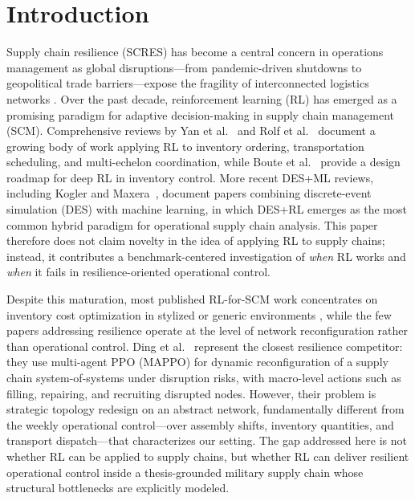 \hypertarget{1-introduction}{%
\section{Introduction}\label{1-introduction}}

Supply chain resilience (SCRES) has become a central concern in
operations management as global disruptions---from pandemic-driven
shutdowns to geopolitical trade barriers---expose the fragility of
interconnected logistics networks \cite{ponomarov2009understanding,wieland2021two,hosseini2019review}. Over the past decade, reinforcement
learning (RL) has emerged as a promising paradigm for adaptive
decision-making in supply chain management (SCM). Comprehensive reviews
by Yan et al.~\cite{yan2022} and Rolf et al.~\cite{rolf2023} document a growing body of
work applying RL to inventory ordering, transportation scheduling, and
multi-echelon coordination, while Boute et al.~\cite{boute2022} provide a design
roadmap for deep RL in inventory control. More recent DES+ML reviews,
including Kogler and Maxera~\cite{kogler2026}, document papers combining discrete-event simulation (DES) with
machine learning, in which DES+RL emerges as the most common hybrid
paradigm for operational supply chain analysis. This paper therefore
does not claim novelty in the idea of applying RL to supply chains;
instead, it contributes a benchmark-centered investigation of
\emph{when} RL works and \emph{when} it fails in resilience-oriented
operational control.

Despite this maturation, most published RL-for-SCM work concentrates on
inventory cost optimization in stylized or generic environments
\cite{gijsbrechts2022,demoor2022,dehaybe2024,geevers2024}, while the few papers addressing resilience operate
at the level of network reconfiguration rather than operational control.
Ding et al.~\cite{ding2026} represent the closest resilience competitor: they use
multi-agent PPO (MAPPO) for dynamic reconfiguration of a supply chain
system-of-systems under disruption risks, with macro-level actions such
as filling, repairing, and recruiting disrupted nodes. However, their
problem is strategic topology redesign on an abstract network,
fundamentally different from the weekly operational control---over
assembly shifts, inventory quantities, and transport dispatch---that
characterizes our setting. The gap addressed here is not whether RL can
be applied to supply chains, but whether RL can deliver resilient
operational control inside a thesis-grounded military supply chain whose
structural bottlenecks are explicitly modeled.

